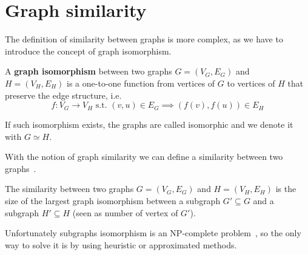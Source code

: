 \section{Graph similarity}

The definition of similarity between graphs is more complex, as we have to introduce the concept of graph isomorphism.

\begin{definizione}
	A \textbf{graph isomorphism} between two graphs $G=(V_{G}, E_{G})$ and $H=(V_{H}, E_{H})$ is a one-to-one function from vertices of $G$ to vertices of $H$ that preserve the edge structure, i.e.  
	\begin{equation}
	f : V_{G} \rightarrow V_{H} \text{ s.t. } (v, u) \in E_{G} \implies (f(v), f(u)) \in E_{H}
	\end{equation}
\end{definizione}

If such isomorphism exists, the graphs are called isomorphic and we denote it with $G \simeq H$.\medskip

With the notion of graph similarity we can define a similarity between two graphs~\cite{Bunke:1998:GDM:289720.289729}.\medskip

\begin{definizione}
	The similarity between two graphs $G=(V_{G}, E_{G})$ and $H=(V_{H}, E_{H})$ is the size of the largest graph isomorphism between a subgraph $G' \subseteq G$ and a subgraph $H' \subseteq H$ (seen as number of vertex of $G'$).
\end{definizione}

Unfortunately subgraphs isomorphism is an NP-complete problem~\cite{GareyJohnson:1979}, so the only way to solve it is by using heuristic or approximated methods.

